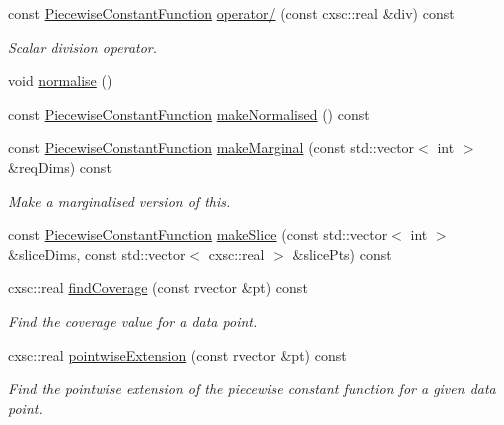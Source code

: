 \begin{DoxyCompactItemize}
const \hyperlink{classsubpavings_1_1PiecewiseConstantFunction}{\-Piecewise\-Constant\-Function} \hyperlink{classsubpavings_1_1PiecewiseConstantFunction_ae7f061e72dc60d46956bfa0f6b4f2b4e}{operator/} (const cxsc\-::real \&div) const 
\begin{DoxyCompactList}\small\item\em \-Scalar division operator. \end{DoxyCompactList}\item 
void \hyperlink{classsubpavings_1_1PiecewiseConstantFunction_aae1c0cd836577f309def9d7a8d9a534a}{normalise} ()
\item 
const \hyperlink{classsubpavings_1_1PiecewiseConstantFunction}{\-Piecewise\-Constant\-Function} \hyperlink{classsubpavings_1_1PiecewiseConstantFunction_ae18f9fc32df16470d268b2bd70b32e9f}{make\-Normalised} () const 
\item 
const \hyperlink{classsubpavings_1_1PiecewiseConstantFunction}{\-Piecewise\-Constant\-Function} \hyperlink{classsubpavings_1_1PiecewiseConstantFunction_a501a9760b607f3275e9ce85eb5cae136}{make\-Marginal} (const std\-::vector$<$ int $>$ \&req\-Dims) const 
\begin{DoxyCompactList}\small\item\em \-Make a marginalised version of this. \end{DoxyCompactList}\item 
const \hyperlink{classsubpavings_1_1PiecewiseConstantFunction}{\-Piecewise\-Constant\-Function} \hyperlink{classsubpavings_1_1PiecewiseConstantFunction_a414799df36e8a5aea60b6ae9b3713cf8}{make\-Slice} (const std\-::vector$<$ int $>$ \&slice\-Dims, const std\-::vector$<$ cxsc\-::real $>$ \&slice\-Pts) const 
\item 
cxsc\-::real \hyperlink{classsubpavings_1_1PiecewiseConstantFunction_adb4501feb027c37159cf926195e1cd44}{find\-Coverage} (const rvector \&pt) const 
\begin{DoxyCompactList}\small\item\em \-Find the coverage value for a data point. \end{DoxyCompactList}\item 
cxsc\-::real \hyperlink{classsubpavings_1_1PiecewiseConstantFunction_abf81273304c10947eab9f5523abbd21b}{pointwise\-Extension} (const rvector \&pt) const 
\begin{DoxyCompactList}\small\item\em \-Find the pointwise extension of the piecewise constant function for a given data point. \end{DoxyCompactList}\item 

\end{DoxyCompactItemize}
